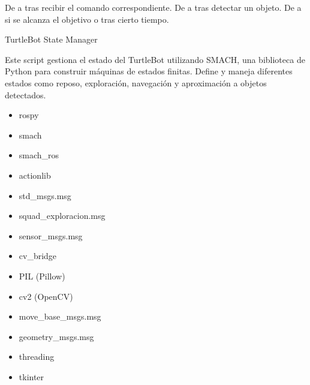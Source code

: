 \documentclass[a4paper,10pt,spanish]{sphinxmanual}
\begin{document}
\sphinxAtStartPar
{}
\sphinxhyphen{} De  a  tras recibir el comando correspondiente.
\sphinxhyphen{} De  a  tras detectar un objeto.
\sphinxhyphen{} De  a  si se alcanza el objetivo o tras cierto tiempo.

\label{\detokenize{squad_state_manager:module-squad_state_manager}}
\sphinxAtStartPar
TurtleBot State Manager

\sphinxAtStartPar
Este script gestiona el estado del TurtleBot utilizando SMACH, una biblioteca de Python
para construir máquinas de estados finitas. Define y maneja diferentes estados como
reposo, exploración, navegación y aproximación a objetos detectados.
\begin{description}
\begin{itemize}
\item {} 
\sphinxAtStartPar
rospy

\item {} 
\sphinxAtStartPar
smach

\item {} 
\sphinxAtStartPar
smach\_ros

\item {} 
\sphinxAtStartPar
actionlib

\item {} 
\sphinxAtStartPar
std\_msgs.msg

\item {} 
\sphinxAtStartPar
squad\_exploracion.msg

\item {} 
\sphinxAtStartPar
sensor\_msgs.msg

\item {} 
\sphinxAtStartPar
cv\_bridge

\item {} 
\sphinxAtStartPar
PIL (Pillow)

\item {} 
\sphinxAtStartPar
cv2 (OpenCV)

\item {} 
\sphinxAtStartPar
move\_base\_msgs.msg

\item {} 
\sphinxAtStartPar
geometry\_msgs.msg

\item {} 
\sphinxAtStartPar
threading

\item {} 
\sphinxAtStartPar
tkinter

\end{itemize}

\end{description}
\end{document}
